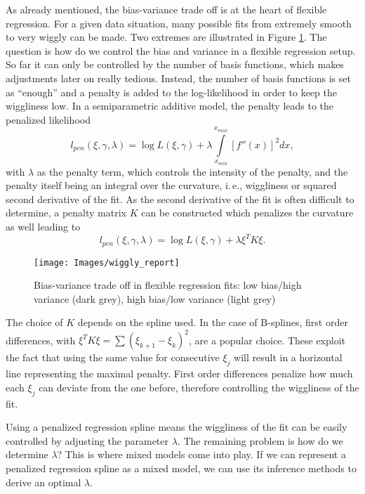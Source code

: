 \documentclass[12pt]{article}
\begin{document}
As already mentioned, the bias-variance trade off is at the heart of flexible regression. For a given data situation, many possible fits from extremely smooth to very wiggly can be made. Two extremes are illustrated in Figure \ref{wiggly}. The question is how do we control the bias and variance in a flexible regression setup. So far it can only be controlled by the number of basis functions, which makes adjustments later on really tedious. Instead, the number of basis functions is set as ``enough'' and a penalty is added to the log-likelihood in order to keep the wiggliness low. In a semiparametric additive model, the penalty leads to the penalized likelihood  
$$l_{pen}(\xi,\gamma, \lambda) =  \log L(\xi, \gamma) + \lambda \int\limits_{x_{min}}^{x_{max}} \left[ f''(x)\right]^2dx,$$
 with $\lambda$ as the penalty term, which controls the intensity of the penalty, and the penalty itself being an integral over the curvature, i.\,e., wiggliness or squared second derivative of the fit. As the second derivative of the fit is often difficult to determine, a penalty matrix $K$ can be constructed which penalizes the curvature as well leading to 
$$l_{pen}(\xi,\gamma, \lambda) = \log L(\xi, \gamma) + \lambda \xi^T K \xi.$$
\begin{figure}[b]
\begin{center}
\vspace{2em}
\texttt{[image: Images/wiggly\_report]}
\end{center}
\vspace{-2em}
\caption[caption]{Bias-variance trade off in flexible regression fits: low bias/high variance (dark grey), high bias/low variance (light grey)}\label{wiggly}
\end{figure}



The choice of $K$ depends on the spline used. In the case of B-splines, first order differences, with $\xi^TK\xi = \sum(\xi_{k+1} - \xi_{k})^2$, are a popular choice. These exploit the fact that using the same value for consecutive $\xi_j$ will result in a horizontal line representing the maximal penalty. First order differences penalize how much each $\xi_j$ can deviate from the one before, therefore controlling the wiggliness of the fit.


Using a penalized regression spline means the wiggliness of the fit can be easily controlled by adjusting the parameter $\lambda$. The remaining problem is how do we determine $\lambda$? This is where mixed models come into play. If we can represent a penalized regression spline as a mixed model, we can use its inference methods to derive an optimal $\lambda$.
\end{document}
